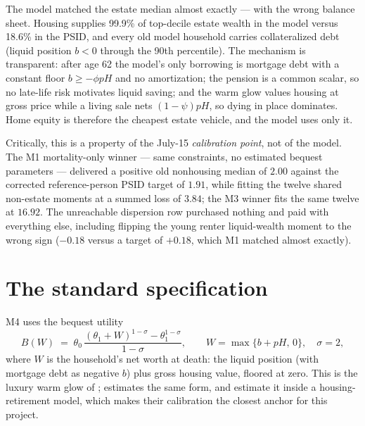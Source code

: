 \documentclass[10pt]{article}
\begin{document}
The model matched the estate median almost exactly --- with the wrong balance
sheet. Housing supplies 99.9\% of top-decile estate wealth in the model
versus 18.6\% in the PSID, and every old model household carries collateralized
debt (liquid position $b<0$ through the 90th percentile). The mechanism is
transparent: after age 62 the model's only borrowing is mortgage debt with a
constant floor $b \geq -\phi p H$ and no amortization; the pension is a
common scalar, so no late-life risk motivates liquid saving; and the warm
glow values housing at gross price while a living sale nets $(1-\psi)pH$, so
dying in place dominates. Home equity is therefore the cheapest estate
vehicle, and the model uses only it.

Critically, this is a property of the July-15 \emph{calibration point}, not
of the model. The M1 mortality-only winner --- same constraints, no estimated
bequest parameters --- delivered a positive old nonhousing median of $2.00$
against the corrected reference-person PSID target of $1.91$, while fitting the twelve shared non-estate moments
at a summed loss of $3.84$; the M3 winner fits the same twelve at $16.92$.
The unreachable dispersion row purchased nothing and paid with everything
else, including flipping the young renter liquid-wealth moment to the wrong
sign ($-0.18$ versus a target of $+0.18$, which M1 matched almost exactly).

\section{The standard specification}

M4 uses the bequest utility
\begin{equation}
B(W) \;=\; \theta_0\,
\frac{(\theta_1+W)^{1-\sigma}-\theta_1^{1-\sigma}}{1-\sigma},
\qquad W=\max\{b+pH,\,0\},\quad \sigma=2,
\label{eq:m4bequest}
\end{equation}
where $W$ is the household's net worth at death: the liquid position (with
mortgage debt as negative $b$) plus gross housing value, floored at zero.
This is the luxury warm glow of \citet{denardi2004}; \citet{lockwood2018}
estimates the same form, and \citet{nakajima2017} estimate it inside a
housing-retirement model, which makes their calibration the closest anchor
for this project.
\end{document}
